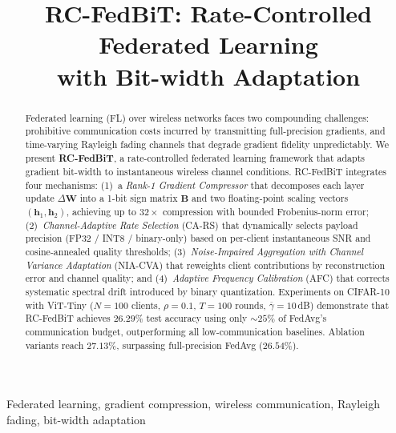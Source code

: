 \documentclass[conference]{IEEEtran}
\begin{document}
\title{RC-FedBiT: Rate-Controlled Federated Learning\\
with Bit-width Adaptation}

\author{
}

\maketitle

\begin{abstract}
Federated learning (FL) over wireless networks faces two compounding challenges: prohibitive communication costs incurred by transmitting full-precision gradients, and time-varying Rayleigh fading channels that degrade gradient fidelity unpredictably. We present \textbf{RC-FedBiT}, a rate-controlled federated learning framework that adapts gradient bit-width to instantaneous wireless channel conditions. RC-FedBiT integrates four mechanisms: (1)~a \emph{Rank-1 Gradient Compressor} that decomposes each layer update $\Delta\mathbf{W}$ into a 1-bit sign matrix $\mathbf{B}$ and two floating-point scaling vectors $(\mathbf{h}_1, \mathbf{h}_2)$, achieving up to $32\times$ compression with bounded Frobenius-norm error; (2)~\emph{Channel-Adaptive Rate Selection} (CA-RS) that dynamically selects payload precision (FP32 / INT8 / binary-only) based on per-client instantaneous SNR and cosine-annealed quality thresholds; (3)~\emph{Noise-Impaired Aggregation with Channel Variance Adaptation} (NIA-CVA) that reweights client contributions by reconstruction error and channel quality; and (4)~\emph{Adaptive Frequency Calibration} (AFC) that corrects systematic spectral drift introduced by binary quantization. Experiments on CIFAR-10 with ViT-Tiny ($N=100$ clients, $\rho=0.1$, $T=100$ rounds, $\overline{\gamma}=10$\,dB) demonstrate that RC-FedBiT achieves $26.29\%$ test accuracy using only $\sim\!25\%$ of FedAvg's communication budget, outperforming all low-communication baselines. Ablation variants reach $27.13\%$, surpassing full-precision FedAvg ($26.54\%$).
\end{abstract}

\begin{IEEEkeywords}
Federated learning, gradient compression, wireless communication, Rayleigh fading, bit-width adaptation
\end{IEEEkeywords}
\end{document}
